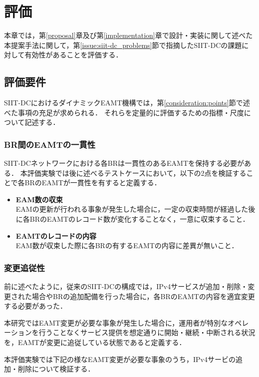 \chapter{評価}
\label{evaluation}
本章では，第\ref{proposal}章及び第\ref{implementation}章で設計・実装に関して述べた本提案手法に関して，第\ref{issue:siit-dc_problems}節で指摘したSIIT-DCの課題に対して有効性があることを評価する．



\section{評価要件}
\label{evaluation:requirements}
SIIT-DCにおけるダイナミックEAMT機構では，第\ref{consideration:points}節で述べた事項の充足が求められる．
それらを定量的に評価するための指標・尺度について記述する．


\subsection{BR間のEAMTの一貫性}
\label{evaluation:requirements:consistency}

SIIT-DCネットワークにおける各BRは一貫性のあるEAMTを保持する必要がある．
本評価実験では後に述べるテストケースにおいて，以下の2点を検証することで各BRのEAMTが一貫性を有すると定義する．
\begin{itemize}
    \item \textbf{EAM数の収束} \\
    EAMの更新が行われる事象が発生した場合に，一定の収束時間が経過した後に各BRのEAMTのレコード数が変化することなく，一意に収束すること．
    \item \textbf{EAMTのレコードの内容} \\
    EAM数が収束した際に各BRの有するEAMTの内容に差異が無いこと．
\end{itemize}

\subsection{変更追従性}
\label{evaluation:requirements:change}
前に述べたように，従来のSIIT-DCの構成では，IPv4サービスが追加・削除・変更された場合やBRの追加配備を行った場合に，各BRのEAMTの内容を適宜変更する必要があった．

本研究ではEAMT変更が必要な事象が発生した場合に，運用者が特別なオペレーションを行うことなくサービス提供を想定通りに開始・継続・中断される状況を，EAMTが変更に追従している状態であると定義する．

本評価実験では下記の様なEAMT変更が必要な事象のうち，IPv4サービの追加・削除について検証する．

